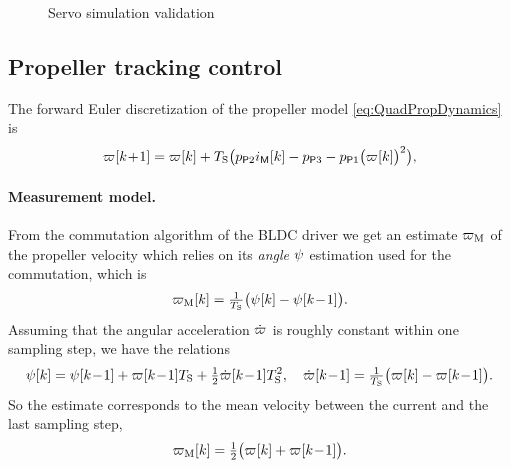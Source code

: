 \begin{figure}
 \centering
 \footnotesize
 
 \caption{Servo simulation validation}
 \label{fig:ServoSimRes}
\end{figure}

\subsection{Propeller tracking control}
The forward Euler discretization of the propeller model \eqref{eq:QuadPropDynamics} is
\begin{align}\label{eq:PropDynamics}
 \PropVel[][k\!+\!1] = \PropVel[][k] + \Ts \big( \PropParam[2] \BLDCCurr[][k] - \PropParam[3] - \PropParam[1] \big( \PropVel[][k]\big)^2 \big),
\end{align}

\paragraph*{Measurement model.}
From the commutation algorithm of the BLDC driver we get an estimate $\PropVelMeas$ of the propeller velocity which relies on its \textit{angle} $\PropAngle$ estimation used for the commutation, which is
\begin{align}
 \PropVelMeas[][k] = \tfrac{1}{\Ts} \big( \PropAngle[][k] - \PropAngle[][k\!-\!1] \big)
 .
\end{align} 
Assuming that the angular acceleration $\PropVeld$ is roughly constant within one sampling step, we have the relations
\begin{align}
 \PropAngle[][k] = \PropAngle[][k\!-\!1] + \PropVel[][k\!-\!1] \Ts + \tfrac{1}{2} \PropVeld[][k\!-\!1] \Ts^2,
\quad
 \PropVeld[][k\!-\!1] = \tfrac{1}{\Ts} \big( \PropVel[][k] - \PropVel[][k\!-\!1] \big)
 .
\end{align}
So the estimate corresponds to the mean velocity between the current and the last sampling step, \ie
\begin{align}\label{eq:PropMeaseq}
 \PropVelMeas[][k] = \tfrac{1}{2} \big( \PropVel[][k] + \PropVel[][k\!-\!1] \big)
 .
\end{align} 

